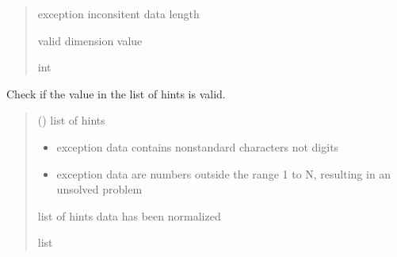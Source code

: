 \documentclass[letterpaper,10pt,english]{sphinxmanual}
\begin{document}
\begin{fulllineitems}
\begin{fulllineitems}
\begin{quote}
\begin{description}
\sphinxAtStartPar
{} \textendash{} exception \sphinxhyphen{} inconsitent data length

\sphinxAtStartPar
valid dimension value

\sphinxAtStartPar
int

\end{description}\end{quote}

\end{fulllineitems}


\begin{fulllineitems}
\label{\detokenize{hints:hints.HintsData.checkHint}}
\pysigstartsignatures
{}
\pysigstopsignatures
\sphinxAtStartPar
Check if the value in the list of hints is valid.
\begin{quote}\begin{description}
\sphinxAtStartPar
{} () \textendash{} list of hints

\begin{itemize}
\item {} 
\sphinxAtStartPar
{} \textendash{} exception \sphinxhyphen{} data contains non\sphinxhyphen{}standard         characters \sphinxhyphen{} not digits

\item {} 
\sphinxAtStartPar
{} \textendash{} exception \sphinxhyphen{} data are numbers outside         the range 1 to N, resulting in an unsolved problem

\end{itemize}

\sphinxAtStartPar
list of hints data has been normalized

\sphinxAtStartPar
list

\end{description}\end{quote}


\end{fulllineitems}
\end{fulllineitems}
\end{document}
